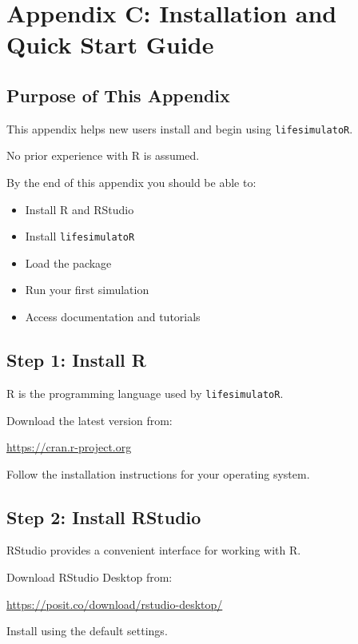 \documentclass[
  oneside,
  openany]{book}
\providecommand{\tightlist}{%
  \setlength{\itemsep}{0pt}\setlength{\parskip}{0pt}}
\begin{document}
\chapter{Appendix C: Installation and Quick Start Guide}\label{appendix-c-installation-and-quick-start-guide}

\section{Purpose of This Appendix}\label{purpose-of-this-appendix-2}

This appendix helps new users install and begin using \texttt{lifesimulatoR}.

No prior experience with R is assumed.

By the end of this appendix you should be able to:

\begin{itemize}
\tightlist
\item
  Install R and RStudio
\item
  Install \texttt{lifesimulatoR}
\item
  Load the package
\item
  Run your first simulation
\item
  Access documentation and tutorials
\end{itemize}

\section{Step 1: Install R}\label{step-1-install-r}

R is the programming language used by \texttt{lifesimulatoR}.

Download the latest version from:

\url{https://cran.r-project.org}

Follow the installation instructions for your operating system.

\section{Step 2: Install RStudio}\label{step-2-install-rstudio}

RStudio provides a convenient interface for working with R.

Download RStudio Desktop from:

\url{https://posit.co/download/rstudio-desktop/}

Install using the default settings.
\end{document}
